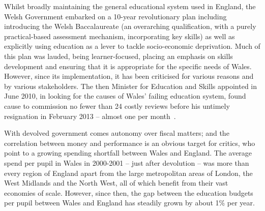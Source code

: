 \documentclass{sig-alternate}
\begin{document}


Whilst broadly maintaining the general educational system
used in England, the Welsh
Government embarked on a 10-year revolutionary plan including
introducing the Welsh
Baccalaureate %
(an overarching qualification, with a purely practical-based
assessment mechanism, incorporating key skills) as well as explicitly
using education as a lever to tackle socio-economic deprivation.
Much of this plan was lauded, being learner-focused, placing an
emphasis on skills development and ensuring that it is appropriate for
the specific needs of Wales. However, since its implementation, it has
been criticised for various reasons and by various stakeholders.  The
then Minister for Education and Skills appointed in June 2010, in
looking for the causes of Wales' failing education system, found cause
to commission no fewer than 24 costly reviews before his untimely
resignation in February 2013 -- almost one per
month~\cite{Evans:2015}.

With devolved government comes autonomy over fiscal matters; and the
correlation between money and performance is an obvious target for
critics, who point to a growing spending shortfall between Wales and
England.  The average spend per pupil in Wales in 2000-2001 -- just
after devolution -- was more than every region of England apart from
the large metropolitan areas of London, the West Midlands and the
North West, all of which benefit from their vast economies of scale.
However, since then, the gap between the education budgets per pupil
between Wales and England has steadily grown by about 1\% per year.
\end{document}
